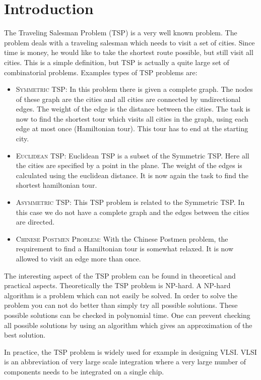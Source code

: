 \section{Introduction}
The Traveling Salesman Problem (TSP) is a very well known problem. The problem
deals with a traveling salesman which needs to visit a set of cities. Since
time is money, he would like to take the shortest route possible, but still
visit all cities. This is a simple definition, but TSP is actually a quite
large set of combinatorial problems. Examples types of  TSP problems are:

\begin{itemize}
\item \textsc{Symmetric TSP:}  In this problem there is given a complete graph.
The nodes of these graph are the cities and all cities are connected by
undirectional edges. The weight of the edge is the distance between the cities.
The task is now to find the shortest tour which visits all cities in the graph,
using each edge at most once (Hamiltonian tour). This tour has to end at the
starting city.
\item \textsc{Euclidean TSP:}  Euclidean TSP is a subset of the Symmetric TSP.
Here all the cities are specified by a point in the plane. The weight of the
edges is calculated using the euclidean distance. It is now again the task to
find the shortest hamiltonian tour.
\item \textsc{Asymmetric TSP:} This TSP problem is related to the Symmetric
TSP. In this case we do not have a complete graph and the edges between the
cities are directed.
\item \textsc{Chinese Postmen Problem:} With the Chinese Postmen problem,  the
requirement to find a Hamiltonian tour is somewhat relaxed. It is now allowed
to visit an edge more than once.
\end{itemize}

The interesting aspect of the TSP problem can be found in theoretical and
practical aspects. Theoretically the TSP problem is NP-hard. A NP-hard
algorithm is a problem which can not easily be solved. In order to solve the
problem you can not do better than simply try all possible solutions. These
possible solutions can be checked in polynomial time.  One can prevent checking
all possible solutions by using an algorithm which gives an approximation of
the best solution.

In practice, the TSP problem is widely used for example in designing  VLSI.
VLSI is an abbreviation of very large scale integration where a very large
number of components needs to be integrated on a single chip.

